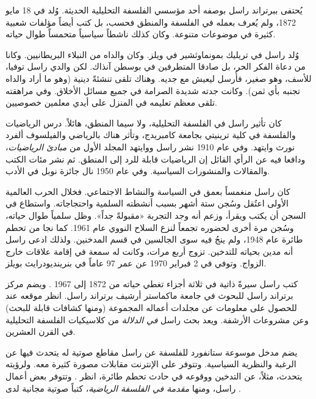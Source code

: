 \documentclass[../../../include/open-logic-section]{subfiles}
\begin{document}



يُحتفى ببرتراند راسل بوصفه أحد مؤسسي الفلسفة التحليلية الحديثة. وُلد في
18 مايو 1872، ولم يُعرف بعمله في الفلسفة والمنطق فحسب، بل كتب أيضاً
مؤلفات شعبية كثيرة في موضوعات متنوعة. وكان كذلك ناشطاً سياسياً متحمساً
طوال حياته.

وُلد راسل في تريليك بمونماوثشير في ويلز. وكان والداه من النبلاء
البريطانيين. وكانا من دعاة الفكر الحر، بل صادقا المتطرفين في بوسطن آنذاك.
لكن والدي راسل توفيا، للأسف، وهو صغير، فأُرسل ليعيش مع جديه. وهناك تلقى
تنشئةً دينية (وهو ما أراد والداه تجنبه بأي ثمن). وكانت جدته شديدة الصرامة
في جميع مسائل الأخلاق. وفي مراهقته تلقى معظم تعليمه في المنزل على أيدي
معلمين خصوصيين.

كان تأثير راسل في الفلسفة التحليلية، ولا سيما المنطق، هائلاً. درس
الرياضيات والفلسفة في كلية ترينيتي بجامعة كامبريدج، وتأثر هناك بالرياضي
والفيلسوف ألفرد نورث وايتهد. وفي عام 1910 نشر راسل ووايتهد المجلد الأول
من \emph{مبادئ الرياضيات}، ودافعا فيه عن الرأي القائل إن الرياضيات قابلة
للرد إلى المنطق. ثم نشر مئات الكتب والمقالات والمنشورات السياسية. وفي
عام 1950 نال جائزة نوبل في الأدب.

كان راسل منغمساً بعمق في السياسة والنشاط الاجتماعي. فخلال الحرب العالمية
الأولى اعتُقل وسُجن ستة أشهر بسبب أنشطته السلمية واحتجاجاته. واستطاع في
السجن أن يكتب ويقرأ، وزعم أنه وجد التجربة «مقبولةً جداً». وظل سلمياً طوال
حياته، وسُجن مرة أخرى لحضوره تجمعاً لنزع السلاح النووي عام 1961. كما نجا
من تحطم طائرة عام 1948، ولم ينجُ فيه سوى الجالسين في قسم المدخنين. ولذلك
ادعى راسل أنه مدين بحياته للتدخين. تزوج أربع مرات، وكانت له سمعة في إقامة
علاقات خارج الزواج. وتوفي في 2 فبراير 1970 عن عمر 97 عاماً في
بنرينديودرايث بويلز.

\begin{reading}
كتب راسل سيرةً ذاتية في ثلاثة أجزاء تغطي حياته من 1872 إلى 1967
\citep{Russell1967,Russell1968,Russell1969}. ويضم مركز برتراند راسل
للبحوث في جامعة ماكماستر أرشيف برتراند راسل. انظر موقعه عند
\citet{Duncan2015} للحصول على معلومات عن مجلدات أعماله المجموعة (ومنها
كشافات قابلة للبحث) وعن مشروعات الأرشفة. ويعد بحث راسل
\emph{في الدلالة} \citep{Russell1905} من كلاسيكيات الفلسفة التحليلية في
القرن العشرين.

يضم مدخل موسوعة ستانفورد للفلسفة عن راسل \citep{Irvine2015} مقاطع صوتية
له يتحدث فيها عن الرغبة والنظرية السياسية. وتتوفر على الإنترنت مقابلات
مصورة كثيرة معه. ولرؤيته يتحدث، مثلاً، عن التدخين ووقوعه في حادث تحطم
طائرة، انظر \citet{RussellND}. وتتوفر بعض أعمال راسل، ومنها
\emph{مقدمة في الفلسفة الرياضية}، كتباً صوتية مجانية لدى
\citet{LibriVoxND}.
\end{reading}
\end{document}

